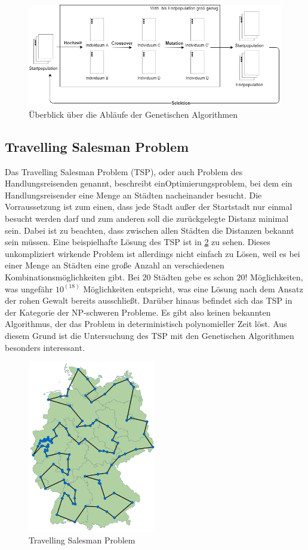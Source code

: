 \begin{figure}[H]
\centering
\includegraphics[width=1\textwidth]{img/Vortrag/Genetic_Algorithm.png}
\caption{Überblick über die Abläufe der Genetischen Algorithmen}
\label{fig:genetic_algorithm}
\end{figure}

\subsection{Travelling Salesman Problem}
Das Travelling Salesman Problem (TSP), oder auch Problem des Handlungsreisenden genannt, beschreibt einOptimierungsproblem, bei dem ein Handlungsreisender eine Menge an Städten nacheinander besucht. Die Vorraussetzung ist zum einen, dass jede Stadt außer der Startstadt nur einmal besucht werden darf und zum anderen soll die zurückgelegte Distanz minimal sein. Dabei ist zu beachten, dass zwischen allen Städten die Distanzen bekannt sein müssen.
Eine beispielhafte Lösung des TSP ist in \ref{fig:TSP} zu sehen. Dieses unkompliziert wirkende Problem ist allerdings nicht einfach zu Lösen, weil es bei einer Menge an Städten eine große Anzahl an verschiedenen Kombinationsmöglichkeiten gibt. Bei 20 Städten gebe es schon $20!$ Möglichkeiten, was ungefähr $10^(18)$ Möglichkeiten entspricht, was eine Lösung nach dem Ansatz der rohen Gewalt bereits ausschließt. Darüber hinaus befindet sich das TSP in der Kategorie der NP-schweren Probleme. Es gibt also keinen bekannten Algorithmus, der das Problem in deterministisch polynomieller Zeit löst. Aus diesem Grund ist die Untersuchung des TSP mit den Genetischen Algorithmen besonders interessant.

\begin{figure}[H]
\centering
\includegraphics[width=0.5\textwidth]{img/Vortrag/tsp.png}
\caption{Travelling Salesman Problem}
\label{fig:TSP}
\end{figure}

